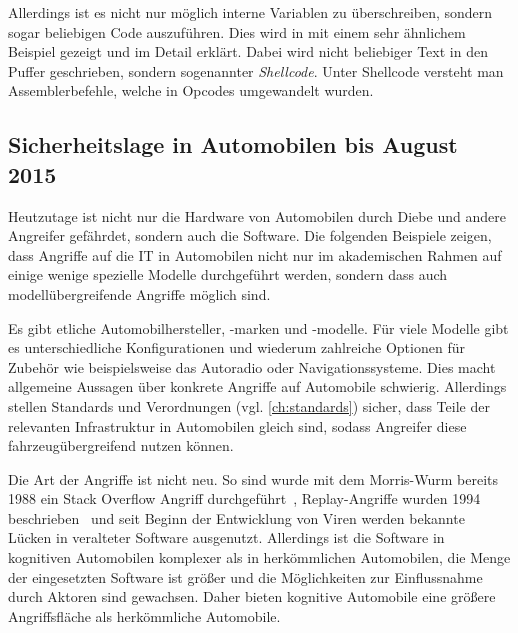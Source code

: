 Allerdings ist es nicht nur möglich interne Variablen zu überschreiben, sondern
sogar beliebigen Code auszuführen. Dies wird in \cite{Mixter} mit einem sehr
ähnlichem Beispiel gezeigt und im Detail erklärt. Dabei wird nicht beliebiger
Text in den Puffer geschrieben, sondern sogenannter \textit{Shellcode}. Unter
Shellcode versteht man Assemblerbefehle, welche in Opcodes umgewandelt wurden.


\subsection{Sicherheitslage in Automobilen bis August 2015}\label{sec:sicherheitslage}
Heutzutage ist nicht nur die Hardware von Automobilen durch Diebe und andere
Angreifer gefährdet, sondern auch die Software. Die folgenden Beispiele zeigen,
dass Angriffe auf die IT in Automobilen nicht nur im akademischen Rahmen
auf einige wenige spezielle Modelle durchgeführt werden, sondern dass auch
modellübergreifende Angriffe möglich sind.

Es gibt etliche Automobilhersteller, -marken und -modelle. Für viele Modelle
gibt es unterschiedliche Konfigurationen und wiederum zahlreiche Optionen für
Zubehör wie beispielsweise das Autoradio oder Navigationssysteme. Dies macht
allgemeine Aussagen über konkrete Angriffe auf Automobile schwierig. Allerdings
stellen Standards und Verordnungen (vgl. \cref{ch:standards}) sicher, dass
Teile der relevanten Infrastruktur in Automobilen gleich sind, sodass Angreifer
diese fahrzeugübergreifend nutzen können.

Die Art der Angriffe ist nicht neu. So sind wurde mit dem Morris-Wurm bereits
1988 ein Stack Overflow Angriff durchgeführt~\cite{Seltzer2013},
Replay-Angriffe wurden 1994 beschrieben~\cite{Syverson1994} und seit Beginn
der Entwicklung von Viren werden bekannte Lücken in veralteter Software
ausgenutzt. Allerdings ist die Software in kognitiven Automobilen komplexer
als in herkömmlichen Automobilen, die Menge der eingesetzten Software ist
größer und die Möglichkeiten zur Einflussnahme durch Aktoren sind gewachsen.
Daher bieten kognitive Automobile eine größere Angriffsfläche als
herkömmliche Automobile.

